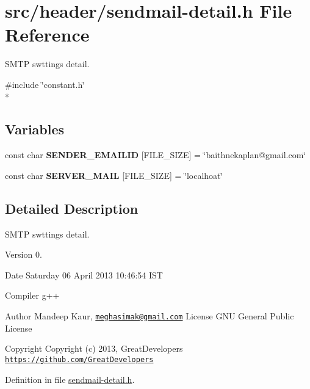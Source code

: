 \hypertarget{sendmail-detail_8h}{\section{src/header/sendmail-\/detail.h File Reference}
\label{sendmail-detail_8h}
}


S\-M\-T\-P swttings detail.  


{\ttfamily \#include \char`\"{}constant.\-h\char`\"{}}\\*
\subsection*{Variables}
\begin{DoxyCompactItemize}
\item 
\hypertarget{sendmail-detail_8h_a6a17dd6df02d3a5118873bc84ce9801d}{const char {\bfseries S\-E\-N\-D\-E\-R\-\_\-\-E\-M\-A\-I\-L\-I\-D} \mbox{[}F\-I\-L\-E\-\_\-\-S\-I\-Z\-E\mbox{]} = \char`\"{}baithnekaplan@gmail.\-com\char`\"{}}\label{sendmail-detail_8h_a6a17dd6df02d3a5118873bc84ce9801d}

\item 
\hypertarget{sendmail-detail_8h_a5a43d9760874d06771eec35419dad507}{const char {\bfseries S\-E\-R\-V\-E\-R\-\_\-\-M\-A\-I\-L} \mbox{[}F\-I\-L\-E\-\_\-\-S\-I\-Z\-E\mbox{]} = \char`\"{}localhoat\char`\"{}}\label{sendmail-detail_8h_a5a43d9760874d06771eec35419dad507}

\end{DoxyCompactItemize}


\subsection{Detailed Description}
S\-M\-T\-P swttings detail. \begin{DoxyVersion}{Version}
0. 
\end{DoxyVersion}
\begin{DoxyDate}{Date}
Saturday 06 April 2013 10\-:46\-:54 I\-S\-T\par
 Compiler g++
\end{DoxyDate}
\begin{DoxyAuthor}{Author}
Mandeep Kaur, \href{mailto:meghasimak@gmail.com}{\tt meghasimak@gmail.\-com} License G\-N\-U General Public License 
\end{DoxyAuthor}
\begin{DoxyCopyright}{Copyright}
Copyright (c) 2013, Great\-Developers \href{https://github.com/GreatDevelopers}{\tt https\-://github.\-com/\-Great\-Developers} 
\end{DoxyCopyright}


Definition in file \hyperlink{sendmail-detail_8h_source}{sendmail-\/detail.\-h}.

